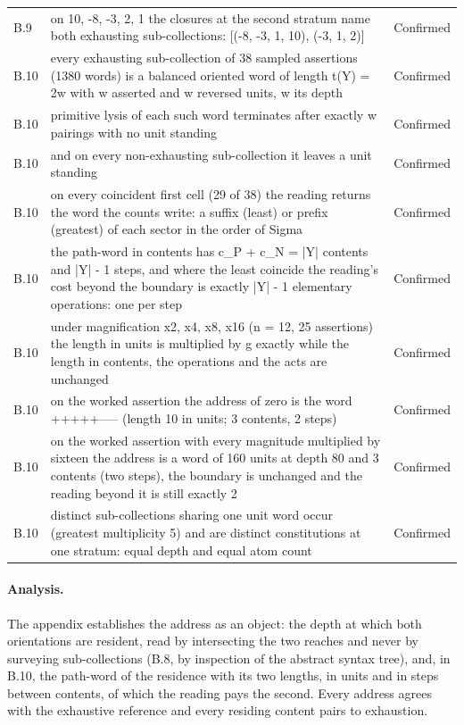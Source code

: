 \documentclass[pdflatex,sn-mathphys-num]{sn-jnl}
\theoremstyle{thmstyleone}%
\theoremstyle{thmstyletwo}%
\theoremstyle{thmstylethree}%
\begin{document}
\begin{appendices}
\begin{longtable}{@{} p{} p{} p{} @{}}
B.9 & on {10, -8, -3, 2, 1} the closures at the second stratum name both exhausting sub-collections: [(-8, -3, 1, 10), (-3, 1, 2)] & Confirmed \\
B.10 & every exhausting sub-collection of 38 sampled assertions (1380 words) is a balanced oriented word of length t(Y) = 2w with w asserted and w reversed units, w its depth & Confirmed \\
B.10 & primitive lysis of each such word terminates after exactly w pairings with no unit standing & Confirmed \\
B.10 & and on every non-exhausting sub-collection it leaves a unit standing & Confirmed \\
B.10 & on every coincident first cell (29 of 38) the reading returns the word the counts write: a suffix (least) or prefix (greatest) of each sector in the order of Sigma & Confirmed \\
B.10 & the path-word in contents has c\_P + c\_N = |Y| contents and |Y| - 1 steps, and where the least coincide the reading's cost beyond the boundary is exactly |Y| - 1 elementary operations: one per step & Confirmed \\
B.10 & under magnification x2, x4, x8, x16 (n = 12, 25 assertions) the length in units is multiplied by g exactly while the length in contents, the operations and the acts are unchanged & Confirmed \\
B.10 & on the worked assertion the address of zero is the word +++++----- (length 10 in units; 3 contents, 2 steps) & Confirmed \\
B.10 & on the worked assertion with every magnitude multiplied by sixteen the address is a word of 160 units at depth 80 and 3 contents (two steps), the boundary is unchanged and the reading beyond it is still exactly 2 & Confirmed \\
B.10 & distinct sub-collections sharing one unit word occur (greatest multiplicity 5) and are distinct constitutions at one stratum: equal depth and equal atom count & Confirmed \\
\end{longtable}\endgroup

\paragraph{Analysis.} The appendix establishes the address as an object: the depth at which both orientations are resident, read by intersecting the two reaches and never by surveying sub-collections (B.8, by inspection of the abstract syntax tree), and, in B.10, the path-word of the residence with its two lengths, in units and in steps between contents, of which the reading pays the second. Every address agrees with the exhaustive reference and every residing content pairs to exhaustion.


\end{appendices}
\end{document}
